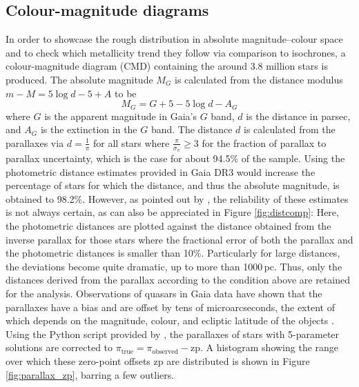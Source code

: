 \documentclass[a4paper,11pt]{article}
\begin{document}
\subsection{Colour-magnitude diagrams}\label{cmd}
In order to showcase the rough distribution in absolute magnitude--colour space and to check which metallicity trend they follow via comparison to isochrones, a colour-magnitude diagram (CMD) containing the around 3.8 million stars is produced. The absolute magnitude $M_G$ is calculated from the distance modulus $m-M=5\log{d}-5+A$ to be
%
\begin{equation}
 M_G=G+5-5\log{d}-A_G
\end{equation}
%
where $G$ is the apparent magnitude in Gaia's $G$ band, $d$ is the distance in parsec, and $A_G$ is the extinction in the $G$ band. The distance $d$ is calculated from the parallaxes via $d=\frac{1}{\pi}$ for all stars where $\frac{\pi}{\sigma_\pi}\geq3$ for the fraction of parallax to parallax uncertainty, which is the case for about 94.5\% of the sample. Using the photometric distance estimates provided in Gaia DR3 would increase the percentage of stars for which the distance, and thus the absolute magnitude, is obtained to 98.2\%. However, as pointed out by \citet{babu23}, the reliability of these estimates is not always certain, as can also be appreciated in Figure \ref{fig:distcomp}: Here, the photometric distances are plotted against the distance obtained from the inverse parallax for those stars where the fractional error of both the parallax and the photometric distances is smaller than 10\%. Particularly for large distances, the deviations become quite dramatic, up to more than 1000\,pc. Thus, only the distances derived from the parallax according to the condition above are retained for the analysis. Observations of quasars in Gaia data have shown that the parallaxes have a bias and are offset by tens of microarcseconds, the extent of which depends on the magnitude, colour, and ecliptic latitude of the objects \citep{lindegren21b}. Using the Python script provided by \citet{lindegren21b}, the parallaxes of stars with 5-parameter solutions are corrected to $\pi_\mathrm{true}=\pi_\mathrm{observed}-\mathrm{zp}$. A histogram showing the range over which these zero-point offsets $\mathrm{zp}$ are distributed is shown in Figure \ref{fig:parallax_zp}, barring a few outliers.
%
\end{document}

